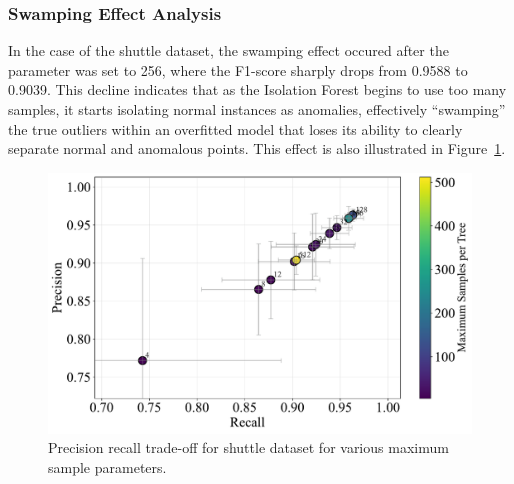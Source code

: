 \documentclass[10pt, conference]{IEEEtran}
\begin{document}
\subsubsection{Swamping Effect Analysis}
In the case of the shuttle dataset, the swamping effect occured after the parameter was set to 256, where the F1-score sharply drops from 0.9588 to 0.9039. This decline indicates that as the Isolation Forest begins to use too many samples, it starts isolating normal instances as anomalies, effectively “swamping” the true outliers within an overfitted model that loses its ability to clearly separate normal and anomalous points. This effect is also illustrated in Figure~\ref{fig:max_samples_shuttle}.

\begin{figure}[H]
	\centering
	\includegraphics[width=\linewidth]{../results/shuttle/max_samples/precision_recall_tradeoff.pdf}
	\caption{Precision recall trade-off for shuttle dataset for various maximum sample parameters.}
	\label{fig:max_samples_shuttle}
\end{figure}
\end{document}
